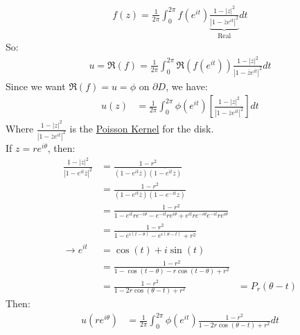 \begin{proposition}
    \begin{align}
        f(z) = \frac{1}{2\pi}\int_{0}^{2\pi} f(e^{it})\underbrace{\frac{1 - |z|^2}{|1 - \overline{z}e^{it}|^2}}_{\text{Real}}dt
    \end{align}
    So:
    \begin{align}
        u = \Re (f) = \frac{1}{2\pi}\int_{0}^{2\pi} \Re(f(e^{it}))\frac{1 - |z|^2}{|1 - \overline{z}e^{it}|^2}dt
    \end{align}
    Since we want $\Re(f) = u = \phi$ on $\partial D$, we have:
    \begin{align}
        u(z) & = \frac{1}{2\pi}\int_{0}^{2\pi}\phi(e^{it})\left[\frac{1 - |z|^2}{|1 - \overline{z}e^{it}|^2}\right]dt
    \end{align}
    Where $\frac{1 - |z|^2}{|1 - \overline{z}e^{it}|^2}$ is the \underline{Poisson Kernel} for the disk.\\
    If $z = re^{i\theta}$, then:
    \begin{align}
        \frac{1 - |z|^2}{|1 - e^{it}\overline{z}|^2} & = \frac{1 - r^2}{(1 - e^{it}\overline{z})\overline{(1 - e^{it}\overline{z})}}                                \\
                                                     & = \frac{1 - r^2}{(1 - e^{it}\overline{z})(1 - e^{-it}z)}                                                     \\
                                                     & = \frac{1 - r^2}{1 - e^{it} re^{-i\theta} - e^{-it} re^{i\theta} + e^{it} re^{-i\theta}e^{-it} re^{i\theta}} \\
                                                     & = \frac{1 - r^2}{1 - e^{i(t-\theta)} - e^{i(\theta -t)} + r^2}                                               \\
        \rightarrow e^{it}                           & = \cos(t) + i\sin(t)                                                                                         \\
                                                     & = \frac{1 - r^2}{1 - \cos(t - \theta) - r\cos(t - \theta) + r^2}                                             \\
                                                     & = \frac{1 - r^2}{1 - 2r\cos(\theta - t) + r^2}
                                                     & = P_r(\theta - t)
    \end{align}
    Then:
    \begin{align}
        u(re^{i\theta}) & = \frac{1}{2\pi}\int_{0}^{2\pi}\phi(e^{it})\frac{1 - r^2}{1 - 2r\cos(\theta - t) + r^2}dt \\

\end{align}
\end{proposition}
